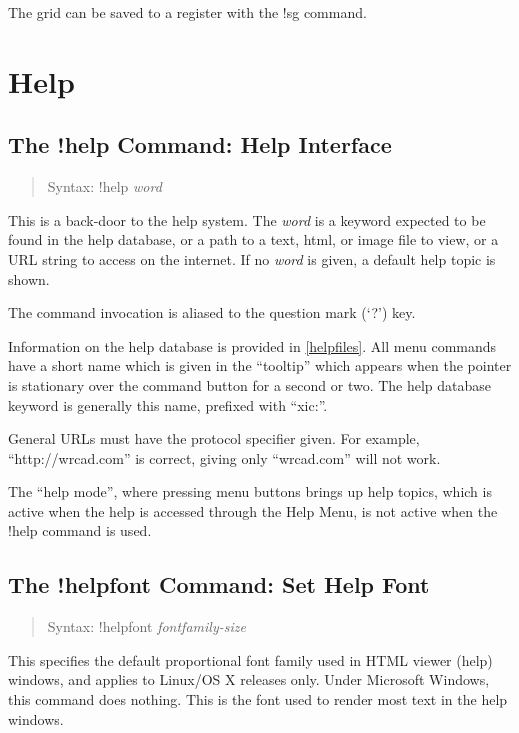 The grid can be saved to a register with the {\cb !sg} command.


\section{Help}

\subsection{The {\cb !help} Command: Help Interface}
\begin{quote}
Syntax: {\vt !help} {\it word}
\end{quote}
This is a back-door to the help system.  The {\it word\/} is a keyword
expected to be found in the help database, or a path to a text, html,
or image file to view, or a URL string to access on the internet.  If
no {\it word} is given, a default help topic is shown.

The command invocation is aliased to the question mark (`{\vt ?}')
key.

Information on the help database is provided in \ref{helpfiles}.  All
menu commands have a short name which is given in the ``tooltip''
which appears when the pointer is stationary over the command button
for a second or two.  The help database keyword is generally this
name, prefixed with ``{\vt xic:}''.

{\rr
General URLs must have the protocol specifier given.  For example,
``{\vt http://wrcad.com}'' is correct, giving only ``{\vt wrcad.com}''
will not work.
}

The ``help mode'', where pressing menu buttons brings up help topics,
which is active when the help is accessed through the {\cb Help Menu},
is not active when the {\cb !help} command is used.

\subsection{The {\cb !helpfont} Command: Set Help Font}
\begin{quote}
Syntax: {\vt !helpfont} {\it fontfamily-size}
\end{quote}
This specifies the default proportional font family used in HTML
viewer (help) windows, and applies to Linux/OS X releases only. 
Under Microsoft Windows, this command does nothing.  This is the font
used to render most text in the help windows.

